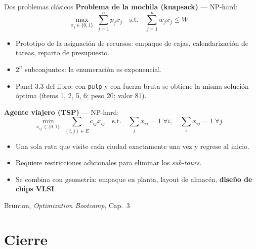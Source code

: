 \documentclass[10pt,aspectratio=169]{beamer}
\newcommand{\fuente}{\vfill{\scriptsize\color{gray}Brunton, \emph{Optimization Bootcamp}, Cap.~3}}
\begin{document}
\begin{frame}{Dos problemas clásicos}
  \small
  \textbf{Problema de la mochila (knapsack)} --- NP-hard:
  \[
    \max_{x_j\in\{0,1\}}\; \sum_{j=1}^n p_j x_j
    \quad \text{s.t.}\quad \sum_{j=1}^n w_j x_j \le W
  \]
  \begin{itemize}
    \item Prototipo de la asignación de recursos: empaque de cajas, calendarización
      de tareas, reparto de presupuesto.
    \item $2^n$ subconjuntos: la enumeración es exponencial.
    \item Panel 3.3 del libro: con \texttt{pulp} y con fuerza bruta se obtiene la
      misma solución óptima (ítems 1, 2, 5, 6; peso 20; valor 81).
  \end{itemize}
  \textbf{Agente viajero (TSP)} --- NP-hard:
  \[
    \min_{x_{ij}\in\{0,1\}}\; \sum_{(i,j)\in E} c_{ij} x_{ij}
    \quad \text{s.t.}\quad \textstyle\sum_j x_{ij}=1 \;\forall i,\quad
    \sum_i x_{ij}=1 \;\forall j
  \]
  \begin{itemize}
    \item Una sola ruta que visite cada ciudad exactamente una vez y regrese al inicio.
    \item Requiere restricciones adicionales para eliminar los \emph{sub-tours}.
    \item Se combina con geometría: empaque en planta, layout de almacén,
      \textbf{diseño de chips VLSI}.
  \end{itemize}
  \fuente
\end{frame}

\section{Cierre}
\end{document}
